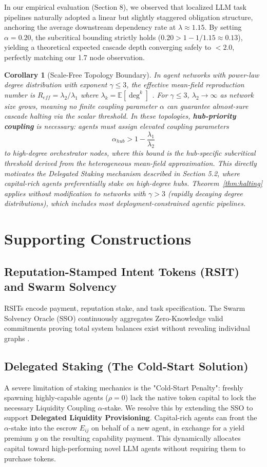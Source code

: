 \documentclass[11pt]{article}
\newtheorem{corollary}{Corollary}[section]
\begin{document}
In our empirical evaluation (Section 8), we observed that localized LLM task pipelines naturally adopted a linear but slightly staggered obligation structure, anchoring the average downstream dependency rate at $\lambda \approx 1.15$. By setting $\alpha=0.20$, the subcritical bounding strictly holds ($0.20 > 1 - 1/1.15 \approx 0.13$), yielding a theoretical expected cascade depth converging safely to $< 2.0$, perfectly matching our 1.7 node observation.

\begin{corollary}[Scale-Free Topology Boundary]
\label{cor:scale_free}
In agent networks with power-law degree distribution with exponent $\gamma \leq 3$, the effective mean-field reproduction number is $R_{eff} = \lambda_2/\lambda_1$ where $\lambda_k = \mathbb{E}[\deg^k]$ \cite{pastor2001epidemic}. For $\gamma \leq 3$, $\lambda_2 \to \infty$ as network size grows, meaning no finite coupling parameter $\alpha$ can guarantee almost-sure cascade halting via the scalar threshold. In these topologies, \textbf{hub-priority coupling} is necessary: agents must assign elevated coupling parameters
$$\alpha_{hub} > 1 - \frac{\lambda_1}{\lambda_2}$$
to high-degree orchestrator nodes, where this bound is the hub-specific subcritical threshold derived from the heterogeneous mean-field approximation. This directly motivates the Delegated Staking mechanism described in Section 5.2, where capital-rich agents preferentially stake on high-degree hubs. Theorem~\ref{thm:halting} applies without modification to networks with $\gamma > 3$ (rapidly decaying degree distributions), which includes most deployment-constrained agentic pipelines.
\end{corollary}

\section{Supporting Constructions}

\subsection{Reputation-Stamped Intent Tokens (RSIT) and Swarm Solvency}
RSITs encode payment, reputation stake, and task specification. The Swarm Solvency Oracle (SSO) continuously aggregates Zero-Knowledge valid commitments proving total system balances exist without revealing individual graphs \cite{okx_zk_2023}.

\subsection{Delegated Staking (The Cold-Start Solution)}
A severe limitation of staking mechanics is the "Cold-Start Penalty": freshly spawning highly-capable agents ($\rho = 0$) lack the native token capital to lock the necessary Liquidity Coupling $\alpha$-stake.
We resolve this by extending the SSO to support \textbf{Delegated Liquidity Provisioning}. Capital-rich agents can front the $\alpha$-stake into the escrow $E_{ij}$ on behalf of a new agent, in exchange for a yield premium $y$ on the resulting capability payment. This dynamically allocates capital toward high-performing novel LLM agents without requiring them to purchase tokens.
\end{document}
